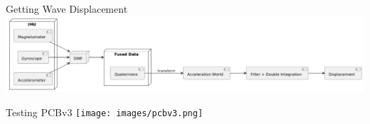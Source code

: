 

\begin{frame}{Getting Wave Displacement}
    \centering
    \includegraphics[height=1\textheight,width=1\textwidth,keepaspectratio]{images/wavedisp2.png}
\end{frame}

\begin{frame}{Testing PCBv3}
    \centering
    \texttt{[image: images/pcbv3.png]}
\end{frame}



